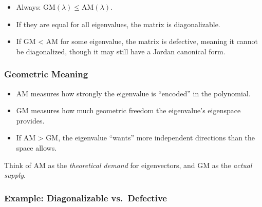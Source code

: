 \documentclass[
  letterpaper,
  DIV=11,
  numbers=noendperiod]{scrreprt}
\providecommand{\tightlist}{%
  \setlength{\itemsep}{0pt}\setlength{\parskip}{0pt}}
\begin{document}
\begin{itemize}
\tightlist
\item
  Always: \(\text{GM}(\lambda) \leq \text{AM}(\lambda)\).
\item
  If they are equal for all eigenvalues, the matrix is diagonalizable.
\item
  If GM \textless{} AM for some eigenvalue, the matrix is defective,
  meaning it cannot be diagonalized, though it may still have a Jordan
  canonical form.
\end{itemize}

\subsubsection{Geometric Meaning}\label{geometric-meaning-11}

\begin{itemize}
\tightlist
\item
  AM measures how strongly the eigenvalue is ``encoded'' in the
  polynomial.
\item
  GM measures how much geometric freedom the eigenvalue's eigenspace
  provides.
\item
  If AM \textgreater{} GM, the eigenvalue ``wants'' more independent
  directions than the space allows.
\end{itemize}

Think of AM as the \emph{theoretical demand} for eigenvectors, and GM as
the \emph{actual supply}.

\subsubsection{Example: Diagonalizable
vs.~Defective}\label{example-diagonalizable-vs.-defective}
\end{document}
